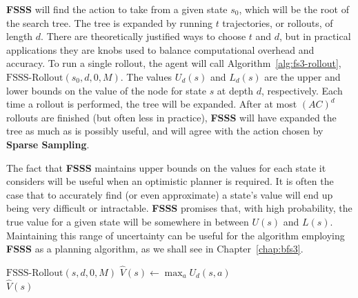 {\bf FSSS} will find the action to take from a given state $s_0$, which will be the root of the search tree.  The tree is expanded by running $t$ trajectories, or rollouts, of length $d$. There are theoretically justified ways to choose $t$ and $d$, but in practical applications they are knobs used to balance computational overhead and accuracy. To run a single rollout, the agent will call Algorithm~\ref{alg:fs3-rollout}, $\mbox{FSSS-Rollout}(s_0, d, 0, M)$.
The values $U_d(s)$ and $L_d(s)$ are the upper and lower bounds on the value of the node for state $s$ at depth $d$, respectively. Each time a rollout is performed, the tree will be expanded. After at most $(AC)^d$ rollouts are finished (but often less in practice), {\bf FSSS} will have expanded the tree as much as is possibly useful, and will agree with the action chosen by {\bf Sparse Sampling}.

The fact that {\bf FSSS} maintains upper bounds on the values for each state it considers will be useful when an optimistic planner is required. It is often the case that to accurately find (or even approximate) a state's value will end up being very difficult or intractable. {\bf FSSS} promises that, with high probability, the true value for a given state will be somewhere in between $U(s)$ and $L(s)$. Maintaining this range of uncertainty can be useful for the algorithm employing {\bf FSSS} as a planning algorithm, as we shall see in Chapter~\ref{chap:bfs3}.

\begin{algorithm}[tb]
	\caption{$\mbox{FSSS}(s, d, t, M)$}
	\label{alg:fs3}

	 {
		$\mbox{FSSS-Rollout}(s, d, 0, M)$
	}
	$\hat V(s) \leftarrow \max_a U_d(s, a)$\\
	\Return $\hat V(s)$
\end{algorithm}

